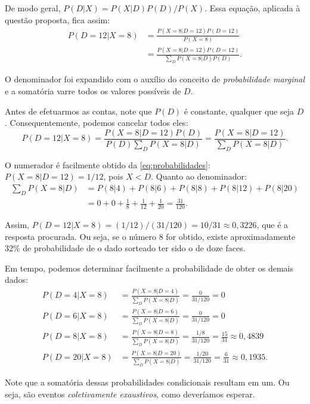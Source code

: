 \begin{question}
\begin{solution}
    De modo geral, $P(D|X) = P(X|D)P(D)/P(X)$.
    Essa equação, aplicada à questão proposta, fica assim:
    \begin{align*}
      P(D=12|X=8) &= \frac{P(X=8|D=12)P(D=12)}{P(X=8)}\\
                  &= \frac{P(X=8|D=12)P(D=12)}{\sum_{D} P(X=8|D)P(D)}.
    \end{align*}

    O denominador foi expandido com o auxílio do conceito de \emph{probabilidade marginal} e a somatória varre todos os valores possíveis de $D$.

    Antes de efetuarmos as contas, note que $P(D)$ é constante, qualquer que seja $D$.
    Consequentemente, podemos cancelar todos eles:
    \begin{equation*}
      P(D=12|X=8) = \frac{P(X=8|D=12)P(D)}{P(D)\sum_{D} P(X=8|D)} = \frac{P(X=8|D=12)}{\sum_{D} P(X=8|D)}.
    \end{equation*}

    O numerador é facilmente obtido da \eqref{eq:probabilidades}: $P(X=8|D=12) = 1/12$, pois $X < D$.
    Quanto ao denominador:
    \begin{align*}
      \sum_{D} P(X=8|D) &= P(8|4) + P(8|6) + P(8|8) + P(8|12) + P(8|20) \\
                        &= 0 + 0 + \frac{1}{8} + \frac{1}{12} + \frac{1}{20} = \frac{31}{120}.
    \end{align*}

    Assim, $P(D=12|X=8) = (1/12)/(31/120) = 10/31 \approx 0,3226$, que é a resposta procurada.
    Ou seja, se o número 8 for obtido, existe aproximadamente 32\% de probabilidade de o dado sorteado ter sido o de doze faces.

    Em tempo, podemos determinar facilmente a probabilidade de obter os demais dados:
    \begin{align*}
      P(D=4|X=8) &= \frac{P(X=8|D=4)}{\sum_{D} P(X=8|D)} = \frac{0}{31/120} = 0 \\
      P(D=6|X=8) &= \frac{P(X=8|D=6)}{\sum_{D} P(X=8|D)} = \frac{0}{31/120} = 0 \\
      P(D=8|X=8) &= \frac{P(X=8|D=8)}{\sum_{D} P(X=8|D)} = \frac{1/8}{31/120} = \frac{15}{31} \approx 0,4839 \\
      P(D=20|X=8) &= \frac{P(X=8|D=20)}{\sum_{D} P(X=8|D)} = \frac{1/20}{31/120} = \frac{6}{31} \approx 0,1935.
    \end{align*}

    Note que a somatória dessas probabilidades condicionais resultam em um.
    Ou seja, são eventos \emph{coletivamente exaustivos}, como deveríamos esperar.


\end{solution}
\end{question}
